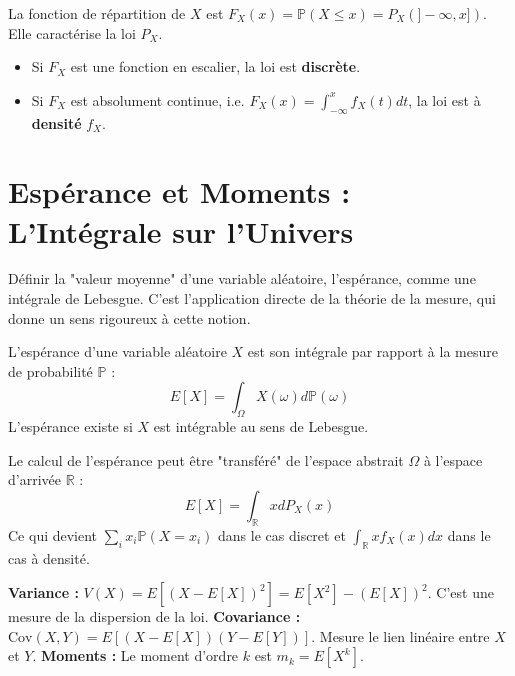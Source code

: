 \begin{definition}
    La fonction de répartition de $X$ est $F_X(x) = \mathbb{P}(X \le x) = P_X(]-\infty, x])$. Elle caractérise la loi $P_X$.
    \begin{itemize}
        \item Si $F_X$ est une fonction en escalier, la loi est \textbf{discrète}.
        \item Si $F_X$ est absolument continue, i.e. $F_X(x) = \int_{-\infty}^x f_X(t)dt$, la loi est à \textbf{densité} $f_X$.
    \end{itemize}
\end{definition}

\section{Espérance et Moments : L'Intégrale sur l'Univers}

\begin{objectif}
    Définir la "valeur moyenne" d'une variable aléatoire, l'espérance, comme une intégrale de Lebesgue. C'est l'application directe de la théorie de la mesure, qui donne un sens rigoureux à cette notion.
\end{objectif}

\begin{definition}[Espérance]
    L'espérance d'une variable aléatoire $X$ est son intégrale par rapport à la mesure de probabilité $\mathbb{P}$ :
    $$ E[X] = \int_\Omega X(\omega) d\mathbb{P}(\omega) $$
    L'espérance existe si $X$ est intégrable au sens de Lebesgue.
\end{definition}

\begin{theorem}
    Le calcul de l'espérance peut être "transféré" de l'espace abstrait $\Omega$ à l'espace d'arrivée $\mathbb{R}$ :
    $$ E[X] = \int_\mathbb{R} x dP_X(x) $$
    Ce qui devient $\sum_i x_i \mathbb{P}(X=x_i)$ dans le cas discret et $\int_\mathbb{R} x f_X(x)dx$ dans le cas à densité.
\end{theorem}

\begin{definition}
    \textbf{Variance :} $V(X) = E[(X-E[X])^2] = E[X^2] - (E[X])^2$. C'est une mesure de la dispersion de la loi.
    \textbf{Covariance :} $\mathrm{Cov}(X,Y) = E[(X-E[X])(Y-E[Y])]$. Mesure le lien linéaire entre $X$ et $Y$.
    \textbf{Moments :} Le moment d'ordre $k$ est $m_k=E[X^k]$.
\end{definition}

